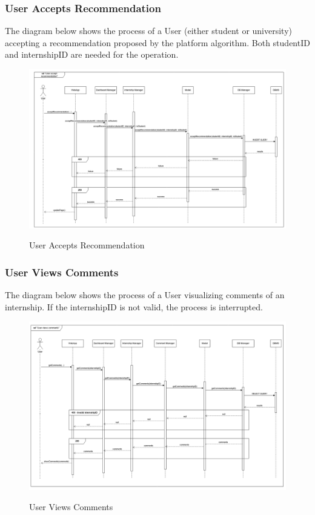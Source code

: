\documentclass[a4paper,12pt]{article}
\begin{document}
\subsubsection*{User Accepts Recommendation}
The diagram below shows the process of a User (either student or university) accepting a recommendation proposed by the platform algorithm. Both studentID and internshipID are needed for the operation.
\begin{figure}[H]
\centering
\includegraphics[scale = 0.4]{DD_figures/RuntimeView/UserAcceptsRecommendationRV.png}\\
\caption{User Accepts Recommendation}
\end{figure}
\newpage

\subsubsection*{User Views Comments}
The diagram below shows the process of a User visualizing comments of an internship. If the internshipID is not valid, the process is interrupted.
\begin{figure}[H]
\centering
\includegraphics[scale = 0.4]{DD_figures/RuntimeView/UserViewsCommentsRV.png}\\
\caption{User Views Comments}
\end{figure}
\newpage
\end{document}
